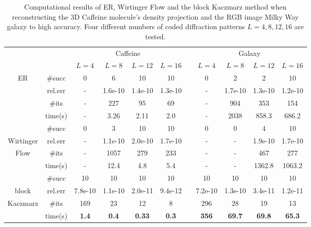 \begin{table}[htp]
\centering
\caption{Computational results of ER, Wirtinger Flow and the block Kaczmarz method
when reconstructing the $3$D Caffeine molecule's density projection and the RGB image Milky Way galaxy to high accuracy. Four different numbers of coded diffraction patterns $L=4,8,12,16$ are tested.}
\vspace{0.2cm}
\begin{tabular}{ccccccccccc}
\hline
\multicolumn{2}{c}{} & \multicolumn{4}{c}{Caffeine}& & \multicolumn{4}{c}{Galaxy}\\
\cline{3-6}\cline{8-11}
\multicolumn{2}{c}{} & $L=4$ & $L=8$ & $L=12$ & $L=16$& & $L=4$ & $L=8$ & $L=12$ & $L=16$\\
\hline
\multirow{4}{*}{ER} & \#succ &0 &6 &10 &10 & &0 &2 &2 &10\\
 & rel.err &- &1.6e-10 &1.4e-10 &1.3e-10 & &- &1.7e-10 &1.3e-10 &1.2e-10\\
 & \#its &- &227 &95 &69 & &- &904 &353 &154\\
 & time(s) &- &3.26 &2.11 &2.0 & &- &2038 &858.3 &686.2\\
\hline
 & \#succ &0 &3 &10 &10 & &0 &0 &4 &10\\
Wirtinger & rel.err &- &1.1e-10 &2.0e-10 &1.7e-10 & &- &- & 1.9e-10&1.7e-10\\
Flow & \#its &- &1057 &279 &233 & &- &- &467 &277\\
 & time(s) &- &12.4 &4.8 &5.4 & &- &- &1362.8 &1063.2\\

\hline
 & \#succ &10 &10 &10 &10 & &10 &10 &10 &10\\
block & rel.err &7.8e-10 &1.1e-10 &2.0e-11 &9.4e-12 & &7.2e-10 &1.3e-10 &3.4e-11 &1.2e-11\\
Kaczmarz & \#its &169 &23 &12 &8 & &296 &28 &19 &13\\
 & time(s) &\textbf{1.4} &\textbf{0.4} &\textbf{0.33} &\textbf{0.3} & &\textbf{356} &\textbf{69.7} &\textbf{69.8} &\textbf{65.3}\\

\hline
\end{tabular}
\end{table}
